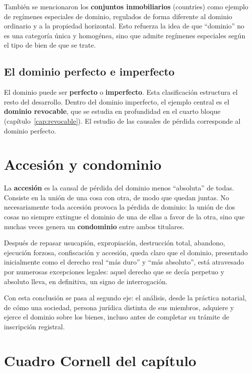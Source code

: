 \documentclass[12pt,oneside]{book}
\begin{document}
También se mencionaron los \textbf{conjuntos inmobiliarios} (countries) como ejemplo de regímenes especiales de dominio, regulados de forma diferente al dominio ordinario y a la propiedad horizontal. Esto refuerza la idea de que ``dominio'' no es una categoría única y homogénea, sino que admite regímenes especiales según el tipo de bien de que se trate.

\subsection{El dominio perfecto e imperfecto}

El dominio puede ser \textbf{perfecto} o \textbf{imperfecto}. Esta clasificación estructura el resto del desarrollo. Dentro del dominio imperfecto, el ejemplo central es el \textbf{dominio revocable}, que se estudia en profundidad en el cuarto bloque (capítulo~\ref{cap:revocable}). El estudio de las causales de pérdida corresponde al dominio perfecto.

\section{Accesión y condominio}
\label{sec:accesion}

La \textbf{accesión} es la causal de pérdida del dominio menos ``absoluta'' de todas. Consiste en la unión de una cosa con otra, de modo que quedan juntas. No necesariamente toda accesión provoca la pérdida de dominio: la unión de dos cosas no siempre extingue el dominio de una de ellas a favor de la otra, sino que muchas veces genera un \textbf{condominio} entre ambos titulares.

Después de repasar usucapión, expropiación, destrucción total, abandono, ejecución forzosa, confiscación y accesión, queda claro que el dominio, presentado inicialmente como el derecho real ``más duro'' y ``más absoluto'', está atravesado por numerosas excepciones legales: aquel derecho que se decía perpetuo y absoluto lleva, en definitiva, un signo de interrogación.

Con esta conclusión se pasa al segundo eje: el análisis, desde la práctica notarial, de cómo una sociedad, persona jurídica distinta de sus miembros, adquiere y ejerce el dominio sobre los bienes, incluso antes de completar su trámite de inscripción registral.

\section{Cuadro Cornell del capítulo}
\end{document}
